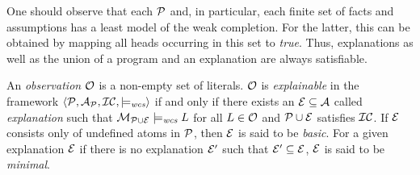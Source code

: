 One should observe that each $\mathcal{P}$ and, in particular, each finite set of facts and assumptions has a least model of the weak completion. For the latter, this can be obtained by mapping all heads occurring in this set to \textit{true}. Thus, explanations as well as the union of a program and an explanation are always satisfiable.
\bigskip
\begin{definition}
\normalfont
An \textit{observation} $\mathcal{O}$ is a non-empty set of literals. $\mathcal{O}$ is \textit{explainable} in the framework $\langle \mathcal{P}, \mathcal{A}_{\mathcal{P}}, {\cal IC}, \models_{\normalfont\textit{wcs}}\rangle$ if and only if there exists an $\mathcal{E} \subseteq \mathcal{A}$ called \textit{explanation} such that $\mathcal{M}_{\mathcal{P} \cup \mathcal{E}} \models_{\normalfont\textit{wcs}} L$ for all $L \in \mathcal{O}$ and $\mathcal{P} \cup \mathcal{E}$ satisfies ${\cal IC}$. If $\mathcal{E}$ consists only of undefined atoms in $\mathcal{P}$, then $\mathcal{E}$ is said to be \textit{basic}. For a given explanation $\mathcal{E}$ if there is no explanation $\mathcal{E}'$ such that $\mathcal{E}' \subseteq \mathcal{E}$, $\mathcal{E}$ is said to be \textit{minimal}. 
\end{definition}
\bigskip
